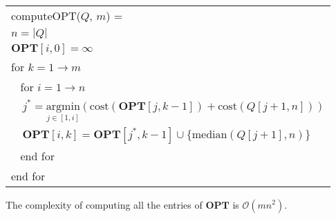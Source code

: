 \vspace{1em}
{\small
\begin{tabular}{|l|} \hline
    computeOPT($Q$, $m$) = \\
    \verb|| $n = |Q|$ \\
    \verb|| $\mathbf{OPT}[i, 0] = \infty$ \\
    \verb|| for $k = 1 \to m$ \\
    \verb| | for $i = 1 \to n$ \\
    \verb|  | $j^* = \underset{j\in[1,i]}{\mathrm{argmin}}
                (\mathrm{cost}(\mathbf{OPT}[j,k-1]) + \mathrm{cost}(Q[j+1, n]))$ \\
    \verb|  | $\mathbf{OPT}[i,k] = \mathbf{OPT}[j^*, k-1] \cup \{\mathrm{median}(Q[j+1], n)\}$ \\
    \verb| | end for \\
    \verb|| end for \\ \hline
\end{tabular}
}
\vspace{1em}

\begin{prop}
    The complexity of computing all the entries of $\mathbf{OPT}$ is
    $\mathcal{O}(mn^2)$.
\end{prop}

